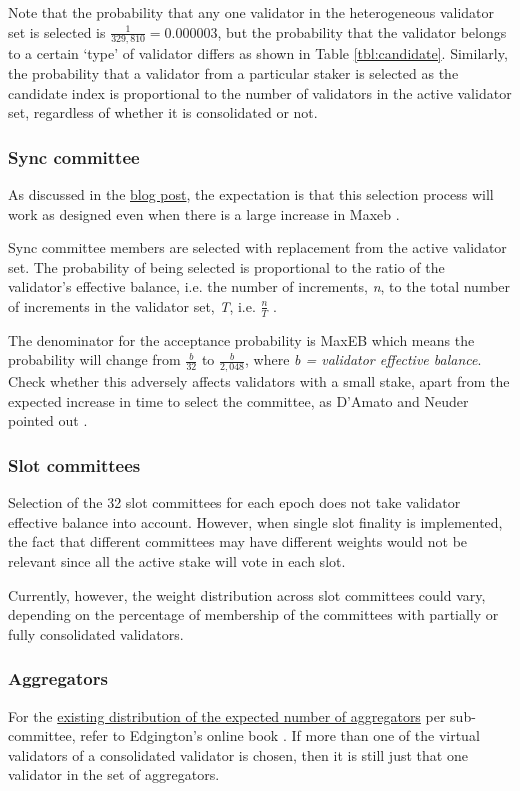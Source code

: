 Note that the probability that any one validator in the heterogeneous validator set is selected is $\frac{1}{329,810} = 0.000003$, but the probability that the validator belongs to a certain `type' of validator differs as shown in Table \ref{tbl:candidate}. Similarly, the probability that a validator from a particular staker is selected as the candidate index is proportional to the number of validators in the active validator set, regardless of whether it is consolidated or not.

\clearpage
\subsubsection*{Sync committee}
As discussed in the \href{https://ethresear.ch/t/increase-the-max-effective-balance-a-modest-proposal/15801/3}{blog post}, the expectation is that this selection process will work as designed even when there is a large increase in Max\gls{eb} \cite{Neuder2023a}.

Sync committee members are selected with replacement from the active validator set. The probability of being selected is proportional to the ratio of the validator's effective balance, i.e. the number of increments, \textit{n}, to the total number of increments in the validator set, \textit{T}, i.e. $\frac{n}{T}$ \cite{Edgington2023}. 

The denominator for the acceptance probability is MaxEB which means the probability will change from $\frac{b}{32}$ to $\frac{b}{2,048}$, where \textit{b = validator effective balance}. Check whether this adversely affects validators with a small stake, apart from the expected increase in time to select the committee, as D'Amato and Neuder pointed out \cite{damato2023}.
\subsubsection*{Slot committees}
Selection of the 32 slot committees for each epoch does not take validator effective balance into account. However, when single slot finality is implemented, the fact that different committees may have different weights would not be relevant since all the active stake will vote in each slot.

Currently, however, the weight distribution across slot committees could vary, depending on the percentage of membership of the committees with partially or fully consolidated validators.
\subsubsection*{Aggregators}
For the \href{https://eth2book.info/capella/part2/building_blocks/aggregator/}{existing distribution of the expected number of aggregators} per sub-committee, refer to Edgington's online book \cite{Edgington2023}.
If more than one of the virtual validators of a consolidated validator is chosen, then it is still just that one validator in the set of aggregators. 
